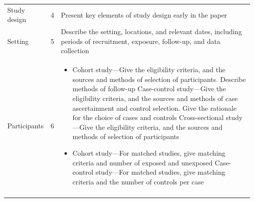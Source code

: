 \documentclass[]{book}
\providecommand{\tightlist}{%
  \setlength{\itemsep}{0pt}\setlength{\parskip}{0pt}}
\begin{document}
\begin{longtable}[]{@{}lll@{}}
\begin{minipage}[t]{0.34\columnwidth}\raggedright
Study design\strut
\end{minipage} & \begin{minipage}[t]{0.17\columnwidth}\raggedright
4\strut
\end{minipage} & \begin{minipage}[t]{0.40\columnwidth}\raggedright
Present key elements of study
design early in the paper\strut
\end{minipage}\tabularnewline
\begin{minipage}[t]{0.34\columnwidth}\raggedright
Setting\strut
\end{minipage} & \begin{minipage}[t]{0.17\columnwidth}\raggedright
5\strut
\end{minipage} & \begin{minipage}[t]{0.40\columnwidth}\raggedright
Describe the setting,
locations, and relevant dates,
including periods of
recruitment, exposure,
follow-up, and data collection\strut
\end{minipage}\tabularnewline
\begin{minipage}[t]{0.34\columnwidth}\raggedright
Participants\strut
\end{minipage} & \begin{minipage}[t]{0.17\columnwidth}\raggedright
6\strut
\end{minipage} & \begin{minipage}[t]{0.40\columnwidth}\raggedright
\begin{itemize}
\tightlist
\item
  Cohort study---Give the
  eligibility criteria, and the
  sources and methods of
  selection of participants.
  Describe methods of follow-up
  Case-control study---Give the
  eligibility criteria, and the
  sources and methods of case
  ascertainment and control
  selection. Give the rationale
  for the choice of cases and
  controls
  Cross-sectional study---Give the
  eligibility criteria, and the
  sources and methods of
  selection of participants
\item
  Cohort study---For matched
  studies, give matching
  criteria and number of exposed
  and unexposed
  Case-control study---For matched
  studies, give matching
  criteria and the number of
  controls per case
\end{itemize}\strut
\end{minipage}\tabularnewline
\begin{minipage}[t]{0.34\columnwidth}\raggedright

\end{minipage}
\end{longtable}
\end{document}
